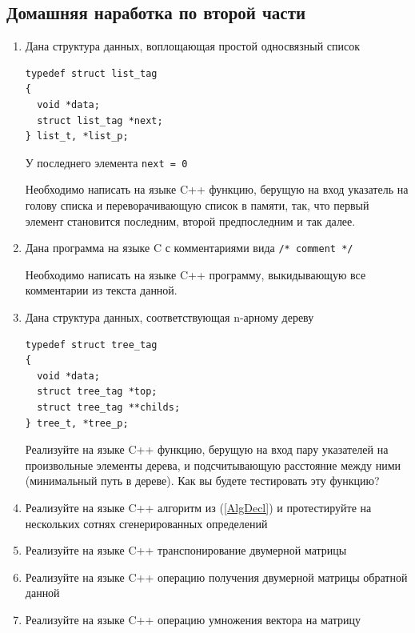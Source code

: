 \documentclass[a4paper,12pt,oneside]{article}
\begin{document}
\pagebreak
\subsection{Домашняя наработка по второй части}
\begin{enumerate}
\item
Дана структура данных, воплощающая простой односвязный список

\begin{lstlisting}
typedef struct list_tag
{
  void *data;
  struct list_tag *next;
} list_t, *list_p;
\end{lstlisting}

У последнего элемента \lstinline!next = 0!

Необходимо написать на языке C++ функцию, берущую на вход указатель на голову списка и переворачивающую список в памяти, так, что первый элемент становится последним, второй предпоследним и так далее.

\item
Дана программа на языке C с комментариями вида \lstinline!/* comment */!

Необходимо написать на языке C++ программу, выкидывающую все комментарии из текста данной.

\item
Дана структура данных, соответствующая n-арному дереву

\begin{lstlisting}
typedef struct tree_tag
{
  void *data;
  struct tree_tag *top;
  struct tree_tag **childs;
} tree_t, *tree_p;
\end{lstlisting}

Реализуйте на языке C++ функцию, берущую на вход пару указателей на произвольные элементы дерева, и подсчитывающую расстояние между ними (минимальный путь в дереве). Как вы будете тестировать эту функцию?

\item
Реализуйте на языке C++ алгоритм из (\ref{AlgDecl}) и протестируйте на нескольких сотнях сгенерированных определений

\item
Реализуйте на языке C++ транспонирование двумерной матрицы

\item
Реализуйте на языке C++ операцию получения двумерной матрицы обратной данной

\item
Реализуйте на языке C++ операцию умножения вектора на матрицу


\end{enumerate}
\end{document}
